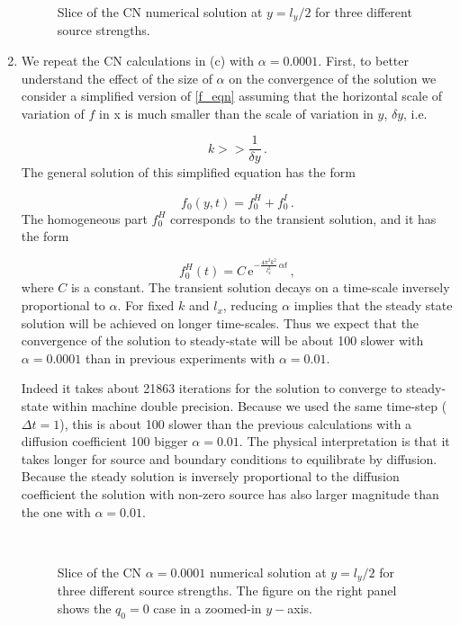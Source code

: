 \documentclass[11pt]{article}
\newcommand{\ee}{\mathrm{e}}
\newcommand{\com}{\, ,}
\newcommand{\per}{\, .}
\def\beq{\begin{equation}}
\def\eeq{\end{equation}}
\begin{document}
\begin{enumerate}[label=(\alph*)]
        \begin{figure}[p]
        \centerline{}
        \caption{Slice of the CN numerical solution at $y=l_y/2$ for three different source strengths.}
        \label{soln_cn}
        \end{figure}



    \item We repeat the CN calculations in (c) with $\alpha = 0.0001$. First, to better understand the effect of the size of $\alpha$ on the convergence of the solution we consider a simplified version of \eqref{f_eqn} assuming that the horizontal scale of variation of $f$ in x is much smaller than the scale of variation in $y$, $\delta y$, i.e.~ 

        \beq
            k >> \frac{1}{\delta y}\per
        \eeq
        The general solution of this simplified equation has the  form

        \beq
            \label{general_soln}
            f_0(y,t) = f_0^H + f_0^I\per
        \eeq
        The homogeneous part $f_0^H$ corresponds to the transient solution, and it has the form

        \beq
        f_0^H(t) = C\,\ee^{-\tfrac{4\pi^2k^2}{l_x^2}\,\alpha t}\com
        \eeq
        where $C$ is a constant. The transient solution decays on a time-scale inversely proportional to $\alpha$. For fixed $k$ and $l_x$, reducing $\alpha$ implies that the steady state solution will be achieved on longer time-scales. Thus we expect that the convergence of the solution to steady-state will be about 100 slower  with $\alpha=0.0001$ than in previous experiments with $\alpha=0.01$. 

        Indeed it takes about 21863 iterations for the solution to converge to steady-state within machine double precision. Because we used the same time-step ($\Delta t =1$), this is about 100 slower than the previous calculations with a diffusion coefficient 100 bigger $\alpha = 0.01$. The physical interpretation is that it takes longer for source and boundary conditions to equilibrate by diffusion. Because the steady solution is inversely proportional to the diffusion coefficient the solution with non-zero source has also larger magnitude than the one with $\alpha=0.01$. 

        \begin{figure}[p]
        \centerline{\\
        }
        \caption{Slice of the CN $\alpha=0.0001$ numerical solution at $y=l_y/2$ for three different source strengths. The figure on the right panel shows the $q_0=0$ case in a zoomed-in $y-$axis.}
        \label{soln_cn}
        \end{figure}



\end{enumerate}
\end{document}
